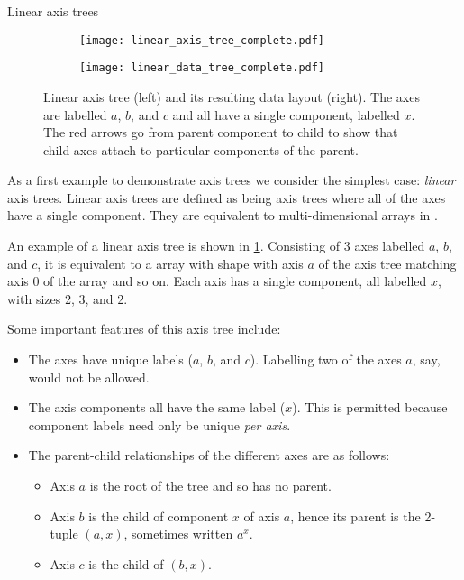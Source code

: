 \documentclass[thesis]{subfiles}
\begin{document}
\begin{example}{Linear axis trees}

\begin{figure}
  \centering
  \begin{subfigure}{.3\textwidth}
    \centering
    \texttt{[image: linear\_axis\_tree\_complete.pdf]}
  \end{subfigure}
  \begin{subfigure}{.3\textwidth}
    \centering
    \texttt{[image: linear\_data\_tree\_complete.pdf]}
  \end{subfigure}
  \caption{
    Linear axis tree (left) and its resulting data layout (right).
    The axes are labelled $a$, $b$, and $c$ and all have a single component, labelled $x$.
    The red arrows go from parent component to child to show that child axes attach to particular components of the parent.
  }
  \label{fig:linear_axis_tree}
\end{figure}

As a first example to demonstrate axis trees we consider the simplest case: \emph{linear} axis trees.
Linear axis trees are defined as being axis trees where all of the axes have a single component.
They are equivalent to multi-dimensional arrays in \numpy.

An example of a linear axis tree is shown in \cref{fig:linear_axis_tree}.
Consisting of 3 axes labelled $a$, $b$, and $c$, it is equivalent to a \numpy array with shape  with axis $a$ of the axis tree matching axis 0 of the \numpy array and so on.
Each axis has a single component, all labelled $x$, with sizes 2, 3, and 2.

Some important features of this axis tree include:

\begin{itemize}
  \item
    The axes have unique labels ($a$, $b$, and $c$).
    Labelling two of the axes $a$, say, would not be allowed.

  \item
    The axis components all have the same label ($x$).
    This is permitted because component labels need only be unique \emph{per axis}.

  \item
    The parent-child relationships of the different axes are as follows:

    \begin{itemize}
      \item Axis $a$ is the root of the tree and so has no parent.
      \item Axis $b$ is the child of component $x$ of axis $a$, hence its parent is the 2-tuple $(a, x)$, sometimes written $a^x$.
      \item Axis $c$ is the child of $(b, x)$.
    \end{itemize}


\end{itemize}
\end{example}
\end{document}
